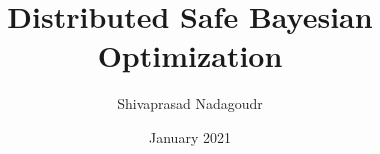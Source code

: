 \documentclass[mtech,thesis]{iist}
\title{Distributed Safe Bayesian Optimization}
\author{Shivaprasad Nadagoudr}
\date{January 2021}
\begin{document}
\maketitle %
\makeabstract %
\maketableofcontents %

\makechaptersettings 




%


\makebibsettings




\makeappendixsettings
%
%

\makeindexsettings
\end{document}
